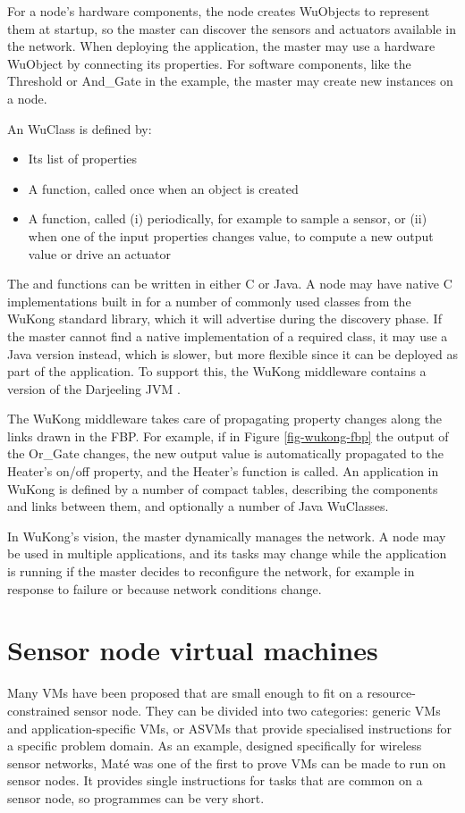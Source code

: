 For a node's hardware components, the node creates WuObjects to represent them at startup, so the master can discover the sensors and actuators available in the network. When deploying the application, the master may use a hardware WuObject by connecting its properties. For software components, like the Threshold or And\_Gate in the example, the master may create new instances on a node.

An WuClass is defined by:
\begin{itemize}
    \item Its list of properties
    \item A  function, called once when an object is created
    \item A  function, called (i) periodically, for example to sample a sensor, or (ii) when one of the input properties changes value, to compute a new output value or drive an actuator
\end{itemize}

The  and  functions can be written in either C or Java. A node may have native C implementations built in for a number of commonly used classes from the WuKong standard library, which it will advertise during the discovery phase. If the master cannot find a native implementation of a required class, it may use a Java version instead, which is slower, but more flexible since it can be deployed as part of the application. To support this, the WuKong middleware contains a version of the Darjeeling JVM \cite{Brouwers:2009cj}.


The WuKong middleware takes care of propagating property changes along the links drawn in the FBP. For example, if in Figure \ref{fig-wukong-fbp} the output of the Or\_Gate changes, the new output value is automatically propagated to the Heater's on/off property, and the Heater's  function is called. An application in WuKong is defined by a number of compact tables, describing the components and links between them, and optionally a number of Java WuClasses.

In WuKong's vision, the master dynamically manages the network. A node may be used in multiple applications, and its tasks may change while the application is running if the master decides to reconfigure the network, for example in response to failure \cite{Su:2014uf} or because network conditions change.


\section{Sensor node virtual machines}
Many VMs have been proposed that are small enough to fit on a resource-constrained sensor node. They can be divided into two categories: generic VMs and application-specific VMs, or ASVMs \cite{Culler05} that provide specialised instructions for a specific problem domain. As an example, designed specifically for wireless sensor networks, Mat\'e \cite{Levis:2002ku} was one of the first to prove VMs can be made to run on sensor nodes. It provides single instructions for tasks that are common on a sensor node, so programmes can be very short.  

